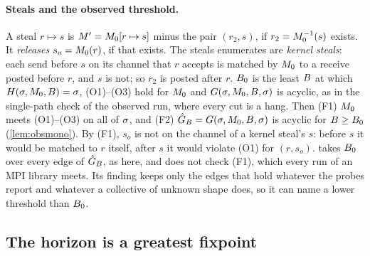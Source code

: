 \paragraph{Steals and the observed threshold.}
A steal $r\mapsto s$ is $M'=M_0[r\mapsto s]$ minus the pair $(r_2,s)$, if
$r_2=M_0^{-1}(s)$ exists. It \emph{releases} $s_o=M_0(r)$, if that exists. The steals
\tool enumerates are \emph{kernel steals}: each send before $s$ on its channel
that $r$ accepts is matched by $M_0$ to a receive posted before $r$, and $s$ is not; so $r_2$
is posted after $r$. $B_0$ is the least $B$ at which $H(\sigma,M_0,B)=\sigma$,
(O1)--(O3) hold for $M_0$ and $G(\sigma,M_0,B,\sigma)$ is acyclic, as in the
single-path check of the observed run, where every cut is a hang. Then (F1) $M_0$ meets
(O1)--(O3) on all of $\sigma$, and (F2) $\hat G_{B}=G(\sigma,M_0,B,\sigma)$ is
acyclic for $B\ge B_0$ (\cref{lem:obsmono}). By (F1), $s_o$ is not on the channel of a
kernel steal's $s$: before $s$ it would be matched to $r$ itself, after $s$ it would violate
(O1) for $(r,s_o)$. \tool takes $B_0$ over every edge of $\hat G_B$, as here, and does not
check (F1), which every run of an MPI library meets. Its  finding keeps only the
edges that hold whatever the probes report and whatever a collective of unknown shape does, so it
can name a lower threshold than $B_0$.

\subsection{The horizon is a greatest fixpoint}
\label{app:fix}

